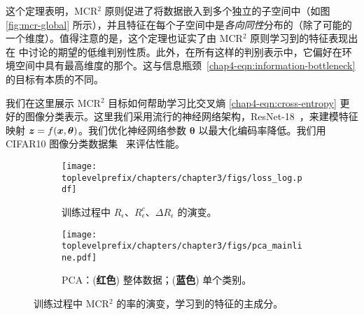 \documentclass[../../book-main.tex]{subfiles}
\begin{document}
这个定理表明，MCR$^2$ 原则促进了将数据嵌入到多个独立的子空间中（如图 \ref{fig:mcr-global} 所示），并且特征在每个子空间中是{\em 各向同性}分布的（除了可能的一个维度）。值得注意的是，这个定理也证实了由 MCR$^2$ 原则学习到的特征表现出在  中讨论的期望的低维判别性质。此外，在所有这样的判别表示中，它偏好在环境空间中具有最高维度的那个。这与信息瓶颈~\eqref{chap4-eqn:information-bottleneck} 的目标有本质的不同。



\begin{example}
	我们在这里展示 MCR$^2$ 目标如何帮助学习比交叉熵 \eqref{chap4-eqn:cross-entropy} 更好的图像分类表示。这里我们采用流行的神经网络架构，ResNet-18~\cite{he2016deep}，来建模特征映射 $\bm{z} = f(\bm{x},\bm \theta)$。我们优化神经网络参数 $\bm \theta$ 以最大化编码率降低。我们用 CIFAR10 图像分类数据集~\cite{krizhevsky2009learning} 来评估性能。

	\begin{figure}[t]
		\begin{subfigure}[t]{0.42\textwidth}
			\centering
			\texttt{[image: \\toplevelprefix/chapters/chapter3/figs/loss\_log.pdf]}
			\caption{训练过程中 $R_\epsilon$、$R^c_\epsilon$、$\Delta R_\epsilon$ 的演变。}
			\label{fig:train-test-loss-pca-1}
		\end{subfigure}
		\hfill
		\begin{subfigure}[t]{0.42\textwidth}
			\centering
			\texttt{[image: \\toplevelprefix/chapters/chapter3/figs/pca\_mainline.pdf]}
			\caption{PCA：{\small (\textbf{红色}) 整体数据；(\textbf{蓝色}) 单个类别。}}
			\label{fig:train-test-loss-pca-3}
		\end{subfigure}
		\caption{\small 训练过程中 MCR$^2$ 的率的演变，学习到的特征的主成分。}
		\label{fig:train-test-loss-pca}
	\end{figure}



\end{example}
\end{document}
